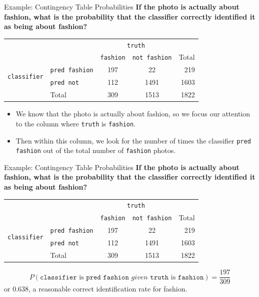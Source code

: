 \begin{frame}{Example: Contingency Table Probabilities}
    \textbf{If the photo is actually about fashion, what is the probability that the classifier correctly identified it as being about fashion?}
    \begin{center}
        \begin{tabular}{r l cc r}
		& & \multicolumn{2}{c}{{\texttt{truth}}} & \\
        \cline{3-4}
		& & \texttt{fashion} & \texttt{not fashion} & Total  \\ 
        \cline{2-5}
        \multirow{2}{*}{{\texttt{classifier}}} 
        & \texttt{pred fashion}   & 197 & 22 & 219 \\ 
  		& \texttt{pred not}       & 112 & 1491 & 1603 \\ 
        \cline{2-5}
  		& Total	& 309 & 1513 & 1822 \\
        \cline{2-5}
    \end{tabular}
    \end{center}
    \begin{itemize}
        \item We know that the photo is actually about fashion, so we focus our attention to the column where \texttt{truth} is \texttt{fashion}. 
        \item Then within this column, we look for the number of times the classifier \texttt{pred fashion} out of the total number of \texttt{fashion} photos.
    \end{itemize}
\end{frame}

\begin{frame}{Example: Contingency Table Probabilities}
    \textbf{If the photo is actually about fashion, what is the probability that the classifier correctly identified it as being about fashion?}
    \begin{center}
        \begin{tabular}{r l cc r}
		& & \multicolumn{2}{c}{{\texttt{truth}}} & \\
        \cline{3-4}
		& & \texttt{fashion} & \texttt{not fashion} & Total  \\ 
        \cline{2-5}
        \multirow{2}{*}{{\texttt{classifier}}} 
        & \texttt{pred fashion}   & 197 & 22 & 219 \\ 
  		& \texttt{pred not}       & 112 & 1491 & 1603 \\ 
        \cline{2-5}
  		& Total	& 309 & 1513 & 1822 \\
        \cline{2-5}
    \end{tabular}
    \end{center}
    \[
    P(\texttt{classifier}\text{ is }\texttt{pred fashion}\textit{ given }\texttt{truth}\text{ is }\texttt{fashion}) = \frac{197}{309}
    \]
    or 0.638, a reasonable correct identification rate for fashion.
\end{frame}

